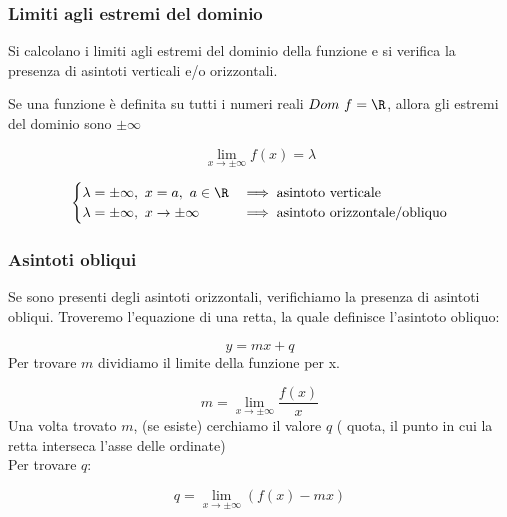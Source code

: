 \documentclass[../analisi.tex]{subfiles}
\begin{document}
\subsubsection{Limiti agli estremi del dominio}
Si calcolano i limiti agli estremi del dominio della funzione e si verifica 
la presenza di asintoti verticali e/o orizzontali.\\


\begin{esem}
	Se una funzione è definita su tutti i numeri reali $Dom\ f = \R $, allora
	gli estremi del dominio sono $ \pm \infty $


	\begin{equation}
		\lim_{x \to \pm\infty} f(x) = \lambda
	\end{equation}
	
	\begin{equation}
		\begin{cases}
			\lambda=\pm \infty,\ x = a,\ a \in \R & \implies
			\text{asintoto verticale}\\
			\lambda=\pm \infty,\ x \to \pm\infty & \implies
			\text{asintoto orizzontale/obliquo}\\
		\end{cases}
	\end{equation}
\end{esem}

\subsubsection{Asintoti obliqui}
Se sono presenti degli asintoti orizzontali, verifichiamo la presenza di 
asintoti obliqui. Troveremo l'equazione di una retta, la quale 
definisce l'asintoto obliquo:

\begin{equation}
	y = mx + q
\end{equation}
Per trovare $ m $ dividiamo il limite della funzione per x.

\begin{equation}
	m = \lim_{x \to \pm\infty} \frac{f(x)}{x}  
\end{equation}
Una volta trovato $ m $, (se esiste) cerchiamo il valore $ q $ ( quota, 
il punto in cui la retta interseca l'asse delle ordinate)\\
Per trovare $ q $:


\begin{equation}
	q = \lim_{x \to \pm\infty} ( f(x) - mx ) 
\end{equation}
	
\end{document}
